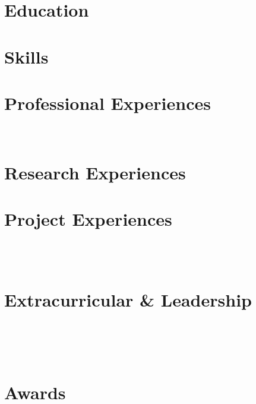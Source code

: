 \documentclass[a4paper,8pt]{article}
\begin{document}


\section{Education}


\section{Skills}


\section{Professional Experiences}

\\ [2pt]


\section{Research Experiences}


\section{Project Experiences}

\\ [2pt]

\\ [2pt]


\section{Extracurricular \& Leadership}

\\ [2pt]

\\ [2pt]

\\ [2pt]


\section{Awards}

\end{document}
